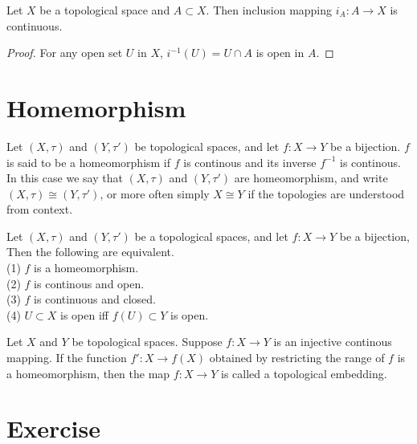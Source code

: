 \begin{proposition}{}{}
    Let $X$ be a topological space and $A\subset X$. 
    Then inclusion mapping $i_A:A\rightarrow X$ is continuous.
\end{proposition}

\begin{proof}
    For any open set $U$ in $X$, $i^{-1}(U)=U\cap A$ is open in $A$.
\end{proof}

\section{Homemorphism}

\begin{definition}{}{}
    Let $(X,\tau)$ and $(Y,\tau')$ be topological spaces, 
    and let $f:X\rightarrow Y$ be a bijection. 
    $f$ is said to be a homeomorphism if $f$ is continous and its inverse $f^{-1}$ is continous.\\
    In this case we say that $(X,\tau)$ and $(Y,\tau')$ are homeomorphism, and write $(X,\tau)\cong (Y,\tau')$, or
    more often simply $X\cong Y$ if the topologies are understood from context.
\end{definition}

\begin{proposition}{}{}
    Let $(X,\tau)$ and $(Y,\tau')$ be a topological spaces, and let $f:X\rightarrow Y$ be a bijection, 
    Then the following are equivalent.\\
    (1) $f$ is a homeomorphism.\\
    (2) $f$ is continous and open.\\
    (3) $f$ is continuous and closed.\\
    (4) $U\subset X$ is open iff $f(U)\subset Y$ is open.
\end{proposition}

\begin{definition}
    Let $X$ and $Y$ be topological spaces. 
    Suppose $f:X\rightarrow Y$ is an injective continous mapping. 
    If the function $f':X\rightarrow f(X)$ obtained by restricting the range of $f$ is a homeomorphism, 
    then the map $f:X\rightarrow Y$ is called a topological embedding.
\end{definition}

\section{Exercise}

